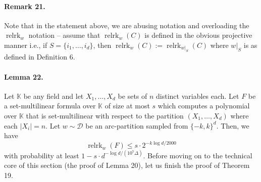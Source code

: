 \paragraph{Remark 21.} Note that in the statement above, we are abusing notation and overloading the $\operatorname{relrk}_w$ notation -- assume that $\operatorname{relrk}_w(C)$ is defined in the obvious projective manner i.e., if $S=\{i_1,\ldots,i_d\}$, then $\operatorname{relrk}_w(C):=\operatorname{relrk}_{w|_S}(C)$ where $w|_S$ is as defined in Definition 6.
\paragraph{Lemma 22.} Let $\mathbb K$ be any field and let $X_1,\ldots,X_d$ be sets of $n$ distinct variables each. Let $F$ be a set-multilinear formula over $\mathbb K$ of size at most $s$ which computes a polynomial over $\mathbb K$ that is set-multilinear with respect to the partition $(X_1,\ldots,X_d)$ where each $|X_i|=n$. Let $w\sim\mathcal D$ be an arc-partition sampled from $\{-k,k\}^d$. Then, we have
\[\operatorname{relrk}_w(F)\leq s\cdot2^{-k\log d/2000}\]
with probability at least $1-s\cdot d^{-\log d/(10^7\Delta)}$.
Before moving on to the technical core of this section (the proof of Lemma 20), let us finish the proof of Theorem 19.
